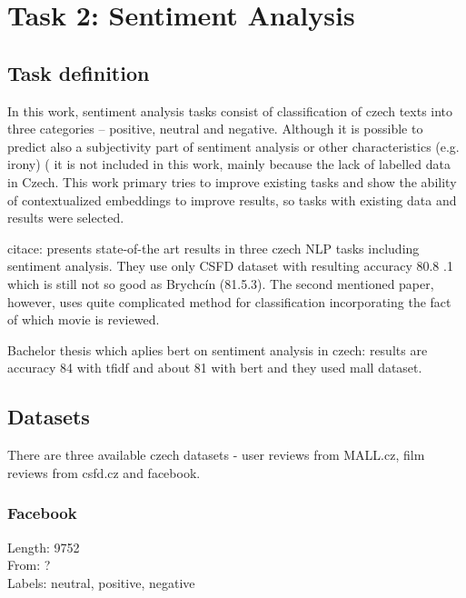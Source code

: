 \chapter{Task 2: Sentiment Analysis}
\label{chap:sent}


\section{Task definition}
In this work, sentiment analysis tasks consist of classification of czech texts into three categories -- positive, neutral and negative. Although it is possible to predict also a subjectivity part of sentiment analysis or other characteristics (e.g. irony) ( %
it is not included in this work, mainly because the lack of labelled data in Czech. This work primary tries to improve existing tasks and show the ability of contextualized embeddings to improve results, so tasks with existing data and results were selected. %




citace:
\citep{Cano2019}
\citep{Hercig2018}
\citep{Li}
\citep{Libovicky} presents state-of-the art results in three czech NLP tasks including sentiment analysis. They use only CSFD dataset with resulting accuracy 80.8 .1 which is still not so good as Brychcín (81.5.3). The second mentioned paper, however, uses quite complicated method for classification incorporating the fact of which movie is reviewed. 


Bachelor thesis which aplies bert on sentiment analysis in czech:
results are accuracy 84 with tfidf and about 81 with bert and they used mall dataset.

\section{Datasets}
There are three available czech datasets - user reviews from MALL.cz, film reviews from csfd.cz and facebook.  %


\subsection{Facebook}
Length: 9752\\
From: ? \\
Labels: neutral, positive, negative


